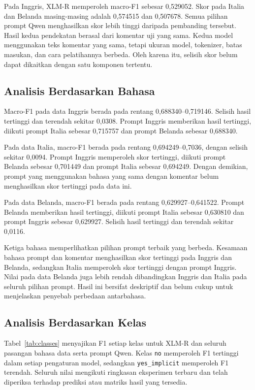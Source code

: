 \documentclass[11pt]{article}
\begin{document}
Pada Inggris, XLM-R memperoleh macro-F1 sebesar 0,529052. Skor pada Italia dan Belanda masing-masing adalah 0,574515 dan 0,507678. Semua pilihan prompt Qwen menghasilkan skor lebih tinggi daripada pembanding tersebut. Hasil kedua pendekatan berasal dari komentar uji yang sama. Kedua model menggunakan teks komentar yang sama, tetapi ukuran model, tokenizer, batas masukan, dan cara pelatihannya berbeda. Oleh karena itu, selisih skor belum dapat dikaitkan dengan satu komponen tertentu.

\subsection{Analisis Berdasarkan Bahasa}
Macro-F1 pada data Inggris berada pada rentang 0,688340--0,719146. Selisih hasil tertinggi dan terendah sekitar 0,0308. Prompt Inggris memberikan hasil tertinggi, diikuti prompt Italia sebesar 0,715757 dan prompt Belanda sebesar 0,688340.

Pada data Italia, macro-F1 berada pada rentang 0,694249--0,7036, dengan selisih sekitar 0,0094. Prompt Inggris memperoleh skor tertinggi, diikuti prompt Belanda sebesar 0,701449 dan prompt Italia sebesar 0,694249. Dengan demikian, prompt yang menggunakan bahasa yang sama dengan komentar belum menghasilkan skor tertinggi pada data ini.

Pada data Belanda, macro-F1 berada pada rentang 0,629927--0,641522. Prompt Belanda memberikan hasil tertinggi, diikuti prompt Italia sebesar 0,630810 dan prompt Inggris sebesar 0,629927. Selisih hasil tertinggi dan terendah sekitar 0,0116.

Ketiga bahasa memperlihatkan pilihan prompt terbaik yang berbeda. Kesamaan bahasa prompt dan komentar menghasilkan skor tertinggi pada Inggris dan Belanda, sedangkan Italia memperoleh skor tertinggi dengan prompt Inggris. Nilai pada data Belanda juga lebih rendah dibandingkan Inggris dan Italia pada seluruh pilihan prompt. Hasil ini bersifat deskriptif dan belum cukup untuk menjelaskan penyebab perbedaan antarbahasa.

\subsection{Analisis Berdasarkan Kelas}
Tabel~\ref{tab:classes} menyajikan F1 setiap kelas untuk XLM-R dan seluruh pasangan bahasa data serta prompt Qwen. Kelas \texttt{no} memperoleh F1 tertinggi dalam setiap pengaturan model, sedangkan \texttt{yes\_implicit} memperoleh F1 terendah. Seluruh nilai mengikuti ringkasan eksperimen terbaru dan telah diperiksa terhadap prediksi atau matriks hasil yang tersedia.
\end{document}
